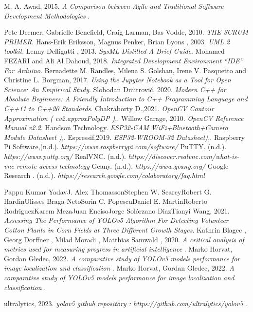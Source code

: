 \begin{thebibliography}{20}
M. A. Awad, 2015. \emph{A Comparison between Agile and Traditional Software Development Methodologies 
}.

Pete Deemer, Gabrielle Benefield, Craig Larman, Bas Vodde, 2010. \emph{THE
SCRUM PRIMER}.
Hans-Erik Eriksson, Magnus Penker, Brian Lyons
, 2003. \emph{UML 2 toolkit}.
Lenny Delligatti , 2013. \emph{SysML Distilled A Brief Guide}.
 Mohamed FEZARI and Ali Al Dahoud, 2018. \emph{Integrated Development Environment “IDE” For Arduino}.
Bernadette M. Randles, Milena S. Golshan, Irene V. Pasquetto and Christine L. Borgman, 2017. \emph{Using the Jupyter Notebook as a Tool for Open Science: An Empirical Study}.
Slobodan Dmitrović, 2020. \emph{ Modern C++ for Absolute Beginners: A Friendly Introduction to C++ Programming Language and C++11 to C++20 Standards}.
Chakraborty D.,2021. \emph{ OpenCV Contour Approximation ( cv2.approxPolyDP ),}.
Willow Garage, 2010. \emph{OpenCV Reference Manual v2.2}.
Handson Technology. \emph{ ESP32-CAM WiFi+Bluetooth+Camera Module Datasheet ),}.
Espressif,2019. \emph{ ESP32-WROOM-32 Datasheet),}.
Raspberry Pi Software,(n.d.). \emph{https://www.raspberrypi.com/software/}
PuTTY. (n.d.). \emph{ https://www.putty.org/}
RealVNC. (n.d.). \emph{ https://discover.realvnc.com/what-is-vnc-remote-access-technology}
Geany. (n.d.). \emph{https://www.geany.org/}
Google Research . (n.d.). \emph{https://research.google.com/colaboratory/faq.html}

Pappu Kumar YadavJ. Alex ThomassonStephen W. SearcyRobert G. HardinUlisses Braga-NetoSorin C. PopescuDaniel E. MartinRoberto RodriguezKarem MezaJuan EncisoJorge Solórzano DiazTianyi Wang, 2021. \emph{ Assessing The Performance of YOLOv5 Algorithm For Detecting Volunteer Cotton Plants in Corn Fields at Three Different Growth Stages}.
Kathrin Blagec  , Georg Dorffner  , Milad Moradi , Matthias Samwald , 2020. \emph{ A critical analysis of metrics used for measuring progress in artificial intelligence }.
Marko Horvat, Gordan Gledec, 2022. \emph{A comparative study of YOLOv5 models performance for image localization and classification  }.
Marko Horvat, Gordan Gledec, 2022. \emph{A comparative study of YOLOv5 models performance for image localization and classification  }.

ultralytics, 2023. \emph{yolov5 github repository : https://github.com/ultralytics/yolov5 }.



\end{thebibliography}
